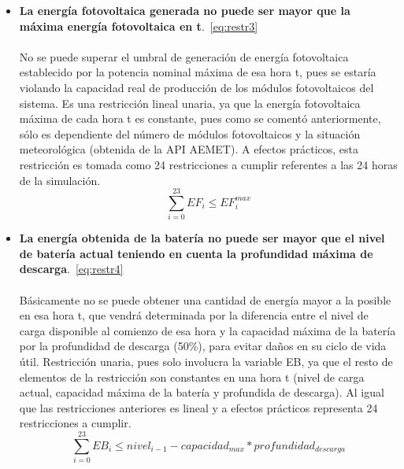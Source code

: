 \begin{itemize}
\item \textbf{La energía fotovoltaica generada no puede ser mayor que la máxima energía fotovoltaica en t}.~\ref{eq:restr3}\\ \\No se puede superar el umbral de generación de energía fotovoltaica establecido por la potencia nominal máxima de esa hora t, pues se estaría violando la capacidad real de producción de los módulos fotovoltaicos del sistema. Es una restricción lineal unaria, ya que la energía fotovoltaica máxima de cada hora t es constante, pues como se comentó anteriormente, sólo es dependiente del número de módulos fotovoltaicos y la situación meteorológica (obtenida de la API AEMET). A efectos prácticos, esta restricción es tomada como 24 restricciones a cumplir referentes a las 24 horas de la simulación.
\begin{equation}
        \label{eq:restr3}
        \sum_{i=0}^{23} EF_{i} \leq EF_{i}^{max}
\end{equation}

\item \textbf{La energía obtenida de la batería no puede ser mayor que el nivel de batería actual teniendo en cuenta la profundidad máxima de descarga}.~\ref{eq:restr4}\\ \\Básicamente no se puede obtener una cantidad de energía mayor a la posible en esa hora t, que vendrá determinada por la diferencia entre el  nivel de carga disponible al comienzo de esa hora y la capacidad máxima de la batería por la profundidad de descarga (50\%), para evitar daños en su ciclo de vida útil. Restricción unaria, pues solo involucra la variable EB, ya que el resto de elementos de la restricción son constantes en una hora t (nivel de carga actual, capacidad máxima de la batería y profundida de descarga). Al igual que las restricciones anteriores es lineal y a efectos prácticos representa 24 restricciones a cumplir.
\begin{equation}
        \label{eq:restr4}
        \sum_{i=0}^{23} EB_{i} \leq nivel_{i-1} - capacidad_{max} * profundidad_{descarga}
\end{equation}


\end{itemize}
